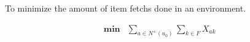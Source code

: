 To minimize the amount of item fetchs done in an environment.

\begin{align*}
    \mathbf{min} &\sum_{a\in N^+(u_0)} \sum_{k \in F} {X_{ak}}
\end{align*}